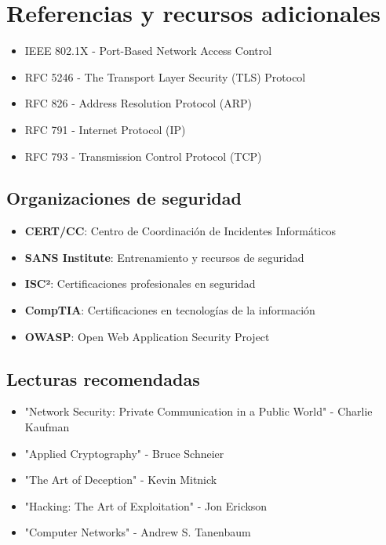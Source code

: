 \section{Referencias y recursos adicionales}

\begin{itemize}
    \item IEEE 802.1X - Port-Based Network Access Control
    \item RFC 5246 - The Transport Layer Security (TLS) Protocol
    \item RFC 826 - Address Resolution Protocol (ARP)
    \item RFC 791 - Internet Protocol (IP)
    \item RFC 793 - Transmission Control Protocol (TCP)
\end{itemize}

\subsection{Organizaciones de seguridad}

\begin{itemize}
    \item \textbf{CERT/CC}: Centro de Coordinación de Incidentes Informáticos
    \item \textbf{SANS Institute}: Entrenamiento y recursos de seguridad
    \item \textbf{ISC²}: Certificaciones profesionales en seguridad
    \item \textbf{CompTIA}: Certificaciones en tecnologías de la información
    \item \textbf{OWASP}: Open Web Application Security Project
\end{itemize}

\subsection{Lecturas recomendadas}

\begin{itemize}
    \item "Network Security: Private Communication in a Public World" - Charlie Kaufman
    \item "Applied Cryptography" - Bruce Schneier
    \item "The Art of Deception" - Kevin Mitnick
    \item "Hacking: The Art of Exploitation" - Jon Erickson
    \item "Computer Networks" - Andrew S. Tanenbaum
\end{itemize}

























